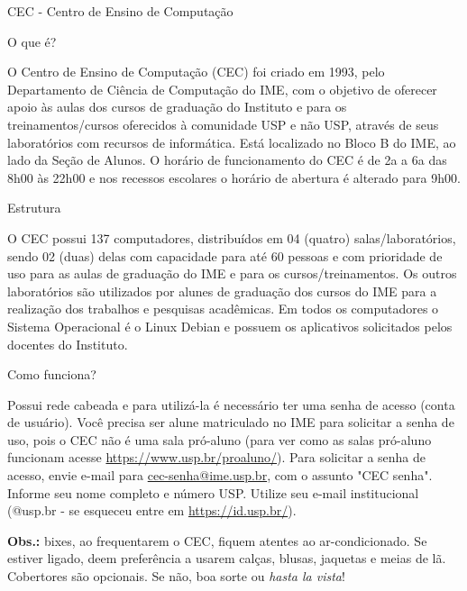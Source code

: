 \begin{secao}{CEC - Centro de Ensino de Computação}

\begin{subsecao}{O que é?}

O Centro de Ensino de Computação (CEC) foi criado em 1993, pelo
Departamento de Ciência de Computação do IME, com o objetivo de
oferecer apoio às aulas dos cursos de graduação do Instituto e para os
treinamentos/cursos oferecidos à comunidade USP e não USP, através de
seus laboratórios com recursos de informática.
Está localizado no Bloco B do IME, ao lado da Seção de Alunos. O horário
de funcionamento do CEC é de 2a a 6a das 8h00 às 22h00 e nos recessos
escolares o horário de abertura é alterado para 9h00.

\end{subsecao}

\begin{subsecao}{Estrutura}

O CEC possui 137 computadores, distribuídos em 04 (quatro) salas/laboratórios,
sendo 02 (duas) delas com capacidade para até 60 pessoas e com prioridade de uso
para as aulas de graduação do IME e para os cursos/treinamentos. Os outros
laboratórios são utilizados por alunes de graduação dos cursos do IME para a
realização dos trabalhos e pesquisas acadêmicas. Em todos os computadores o Sistema
Operacional é o Linux Debian e possuem os aplicativos solicitados pelos docentes
do Instituto.

\end{subsecao}

\begin{subsecao}{Como funciona?}

Possui rede cabeada e para utilizá-la é necessário ter uma senha de
acesso (conta de usuário). Você precisa ser alune matriculado no IME para
solicitar a senha de uso, pois o CEC não é uma sala pró-aluno (para ver
como as salas pró-aluno funcionam acesse \url{https://www.usp.br/proaluno/}). 
Para solicitar a senha de acesso, envie e-mail para \url{cec-senha@ime.usp.br},
com o assunto "CEC senha". Informe seu nome completo e número USP. Utilize
seu e-mail institucional (@usp.br - se esqueceu entre em
\url{https://id.usp.br/}).

\end{subsecao}

\textbf{Obs.:} bixes, ao frequentarem o CEC, fiquem atentes ao ar-condicionado. Se
estiver ligado, deem preferência a usarem calças, blusas, jaquetas e meias de
lã. Cobertores são opcionais. Se não, boa sorte ou \textit{hasta la vista}!

\end{secao}
